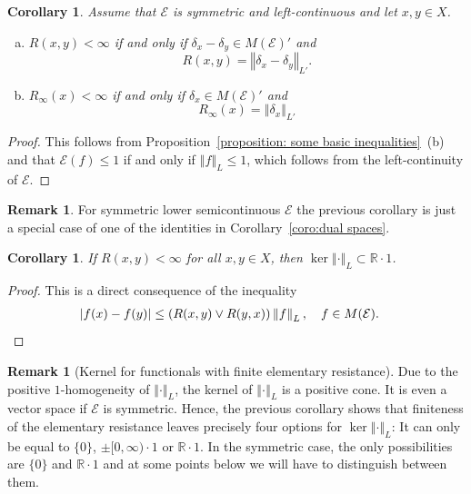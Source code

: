 \documentclass[a4paper,11pt,reqno]{amsart}
\newtheorem{corollary}[lemma]{Corollary}
\theoremstyle{definition}
\newtheorem{remark}[lemma]{Remark}
\numberwithin{equation}{section}
\newcommand{\cE}{{\mathcal E}}
\newcommand{\R}{{\mathbb R}}
\newcommand{\av}[1]{\left\Vert #1\right\Vert}
\newcommand{\1}{\mathds{1}}
\begin{document}
\begin{corollary}\label{coro:elementary resistance as dual norm}
Assume that $\cE$ is symmetric and left-continuous and let $x,y \in X$. 
\begin{enumerate}[(a)]
 \item $R(x,y) < \infty$ if and only if $\delta_x - \delta_y \in M(\cE)'$ and 
 $$R(x,y) = \av{\delta_x - \delta_y}_{L'}.$$
 \item $R_\infty(x)  < \infty$ if and only if $\delta_x \in M(\cE)'$ and
 $$R_\infty(x) = \av{\delta_x}_{L'}$$
\end{enumerate}
\end{corollary}
\begin{proof}
 This follows from Proposition~\ref{proposition: some basic inequalities}~(b) and that $\cE(f) \leq 1$ if and only if $\av{f}_L \leq 1$, which follows from the left-continuity of $\cE$. 
\end{proof}

\begin{remark}
 For symmetric lower semicontinuous $\cE$ the previous corollary is just a special case of one of the identities in Corollary~\ref{coro:dual spaces}.
\end{remark}






%  
% 




 

\begin{corollary}\label{coro:kernel of e for finite elementary resistance}
 If $R(x,y) < \infty$ for all $x,y \in X$, then $\ker \av{\cdot}_L \subset \R  \cdot 1$.  
\end{corollary}
\begin{proof}
 This is a direct consequence of the inequality 
 \begin{align*}
 |f(x) - f(y)| &\leq (R(x,y) \vee R(y,x)) \av{f}_L, \quad f \in M(\cE). \hfill \qedhere
 \end{align*}
\end{proof}

 \begin{remark}[Kernel for functionals with finite elementary resistance]
Due to the positive $1$-homogeneity of $\av{\cdot}_L$, the kernel of $\av{\cdot}_L$ is a positive cone. It is even a vector space if $\cE$ is symmetric. Hence, the previous corollary shows that finiteness of the elementary resistance leaves precisely four options for $\ker \av{\cdot}_L$:  It can only be equal to $\{0\}$, $\pm [0,\infty) \cdot 1$ or $\R \cdot 1$. In the symmetric case, the only possibilities are $\{0\}$ and  $\R \cdot 1$ and at some points below we will have to distinguish between them. 
\end{remark}
\end{document}
